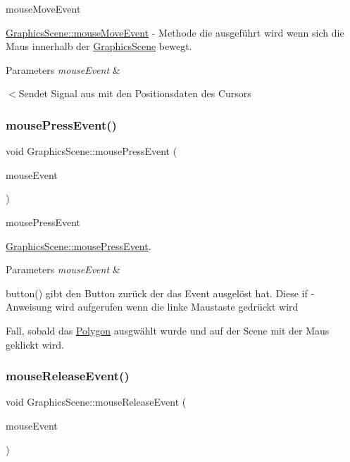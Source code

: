 mouse\+Move\+Event 

\hyperlink{class_graphics_scene_a85927a0baa140f37d2c918866c6879f1}{Graphics\+Scene\+::mouse\+Move\+Event} -\/ Methode die ausgeführt wird wenn sich die Maus innerhalb der \hyperlink{class_graphics_scene}{Graphics\+Scene} bewegt.


\begin{DoxyParams}{Parameters}
{\em mouse\+Event} & \\
\hline
\end{DoxyParams}
$<$Sendet Signal aus mit den Positionsdaten des Cursors \mbox{\label{class_graphics_scene_a68d455a648fe4a6717a1771c7fe04f31}} 
\subsubsection{\texorpdfstring{mouse\+Press\+Event()}{mousePressEvent()}}
{\footnotesize\ttfamily void Graphics\+Scene\+::mouse\+Press\+Event (\begin{DoxyParamCaption}\item[{Q\+Graphics\+Scene\+Mouse\+Event $\ast$}]{mouse\+Event }\end{DoxyParamCaption})}



mouse\+Press\+Event 

\hyperlink{class_graphics_scene_a68d455a648fe4a6717a1771c7fe04f31}{Graphics\+Scene\+::mouse\+Press\+Event}.


\begin{DoxyParams}{Parameters}
{\em mouse\+Event} & \\
\hline
\end{DoxyParams}
button() gibt den Button zurück der das Event ausgelöst hat. Diese if -\/ Anweisung wird aufgerufen wenn die linke Maustaste gedrückt wird

Fall, sobald das \hyperlink{class_polygon}{Polygon} ausgwählt wurde und auf der Scene mit der Maus geklickt wird.\mbox{\label{class_graphics_scene_aadc9534ab8b8fbb5e7c02a0b761c750a}} 
\subsubsection{\texorpdfstring{mouse\+Release\+Event()}{mouseReleaseEvent()}}
{\footnotesize\ttfamily void Graphics\+Scene\+::mouse\+Release\+Event (\begin{DoxyParamCaption}\item[{Q\+Graphics\+Scene\+Mouse\+Event $\ast$}]{mouse\+Event }\end{DoxyParamCaption})}



